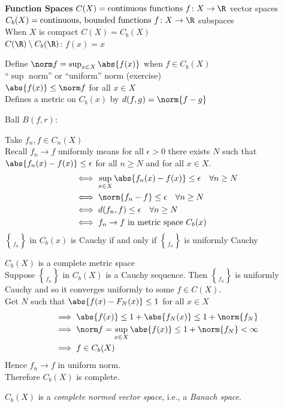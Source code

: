 \textbf{Function Spaces}
$ C(X) = \text{continuous functions $f\colon X\to\R$} $ vector spaces \\
$ C_b(X) = \text{continuous, bounded functions $f\colon X\to\R$} $ subspaces \\
When $X$ is compact $C(X)=C_b(X)$ \\
$C(\R)\setminus C_b(\R)$: $f(x)=x$

Define $\norm f=\sup_{x\in X}\abs{f(x)}$ when $f\in C_b(X)$ \\
``$\sup$ norm'' or ``uniform'' norm (exercise) \\
$\abs{f(x)}\leq\norm f$ for all $x\in X$ \\
Defines a metric on $C_b(x)$ by $d(f,g)=\norm{f-g}$ %

Ball $B(f,r)$:

Take $f_n,f\in C_n(X)$ \\
Recall $f_n\to f$ uniformly means for all $\epsilon>0$ there exists $N$ such that $\abs{f_n(x)-f(x)}\leq\epsilon$ for all $n\geq N$ and for all $x\in X$.
\begin{align*}
&\iff \sup_{x\in X}\abs{f_n(x)-f(x)}\leq\epsilon\quad\forall n\geq N \\
&\iff \norm{f_n-f}\leq\epsilon\quad\forall n\geq N \\
&\iff d(f_n,f)\leq\epsilon\quad\forall n\geq N \\
&\iff f_n\to f \text{ in metric space $C_b(x)$}
\end{align*}
$\brace{f_n}$ in $C_b(x)$ is Cauchy if and only if $\brace{f_n}$ is uniformly Cauchy

\thm $C_b(X)$ is a complete metric space \\
\pf Suppose $\brace{f_n}$ in $C_b(X)$ is a Cauchy sequence.  Then $\brace{f_n}$ is uniformly Cauchy and so it converges uniformly to some $f\in C(X)$. \\
Get $N$ such that $\abs{f(x)-F_N(x)}\leq1$ for all $x\in X$
\begin{align*}
&\implies \abs{f(x)}\leq 1 + \abs{f_N(x)} \leq 1 + \norm{f_N} \\
&\implies \norm f = \sup_{x\in X}\abs{f(x)} \leq 1 + \norm{f_N} < \infty \\
&\implies f \in C_b(X)
\end{align*}
Hence $f_n\to f$ in uniform norm. \\
Therefore $C_b(X)$ is complete.

$C_b(X)$ is a \emph{complete normed vector space}, i.e., a \emph{Banach space}.